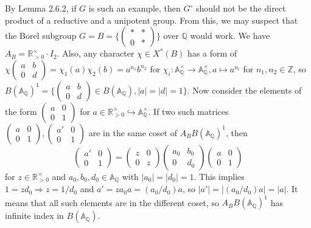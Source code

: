 \begin{problem}
By Lemma 2.6.2, if $G$ is such an example, then $G^\circ$ should not be the direct product of
a reductive and a unipotent group. 
From this, we may suspect that the Borel subgroup $G = B = \{(\begin{smallmatrix} * & * \\ 0 & * \end{smallmatrix})\}$ over $\mathbb{Q}$ would work.
We have $A_B = \mathbb{R}^{\times}_{>0}\cdot  I_2$.
Also, any character $\chi \in X^{*}(B)$ has a form of $\chi(\begin{smallmatrix}
    a & b\\ 0 & d
\end{smallmatrix}) = \chi_1(a)\chi_2(b) = a^{n_1} b^{n_2}$ for $\chi_i: \mathbb{A}_\mathbb{Q}^\times \to \mathbb{A}_\mathbb{Q}^\times, a \mapsto a^{n_i}$ for $n_1, n_2 \in \mathbb{Z}$,
so $B(\mathbb{A}_\mathbb{Q})^1 = \{(\begin{smallmatrix} a & b \\ 0 & d \end{smallmatrix}) \in B(\mathbb{A}_\mathbb{Q}), |a| = |d| = 1\}$.
Now consider the elements of the form $(\begin{smallmatrix}
    a & 0 \\ 0 & 1
\end{smallmatrix})$ for $a\in \mathbb{R}_{>0}^\times \hookrightarrow \mathbb{A}_\mathbb{Q}^\times$.
If two such matrices $(\begin{smallmatrix}a & 0 \\ 0 & 1\end{smallmatrix}), (\begin{smallmatrix}a' & 0 \\ 0 & 1\end{smallmatrix})$ are in the same coset of $A_B B(\mathbb{A}_\mathbb{Q})^1$, then
$$
\begin{pmatrix}
    a' & 0 \\ 0 & 1
\end{pmatrix} = \begin{pmatrix} z & 0  \\ 0 & z \end{pmatrix} \begin{pmatrix} a_0 & b_0 \\ 0 & d_0 \end{pmatrix}\begin{pmatrix}
    a & 0 \\ 0 & 1
\end{pmatrix}
$$
for $z \in \mathbb{R}_{>0}^\times$ and $a_0, b_0, d_0 \in \mathbb{A}_\mathbb{Q}$ with $|a_0| = |d_0| = 1$.
This implies $1 = zd_0 \Rightarrow z = 1/d_0$ and $a' = za_0 a = (a_0 / d_0) a$, so $|a'| = |(a_0/d_0)a| = |a|$.
It means that all such elements are in the different coset, so $A_B B(\mathbb{A}_\mathbb{Q})^1$ has infinite index in $B(\mathbb{A}_\mathbb{Q})$.
\end{problem}


